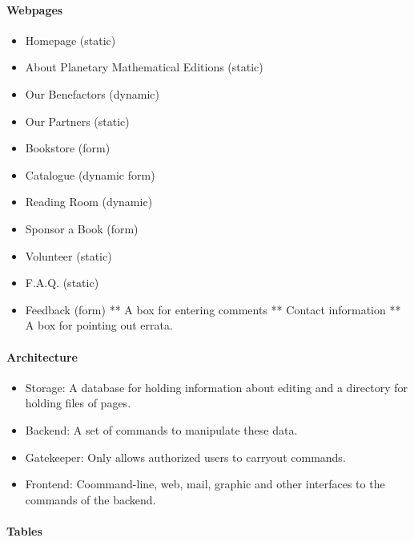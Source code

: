 \begin{itemize}
\paragraph{Webpages}

\begin{itemize}
\item
  Homepage (static)
\item
  About Planetary Mathematical Editions (static)
\item
  Our Benefactors (dynamic)
\item
  Our Partners (static)
\item
  Bookstore (form)
\item
  Catalogue (dynamic form)
\item
  Reading Room (dynamic)
\item
  Sponsor a Book (form)
\item
  Volunteer (static)
\item
  F.A.Q. (static)
\item
  Feedback (form) ** A box for entering comments ** Contact information
  ** A box for pointing out errata.
\end{itemize}

\paragraph{Architecture}

\begin{itemize}
\item
  Storage: A database for holding information about editing and a
  directory for holding files of pages.
\item
  Backend: A set of commands to manipulate these data.
\item
  Gatekeeper: Only allows authorized users to carryout commands.
\item
  Frontend: Coommand-line, web, mail, graphic and other interfaces to
  the commands of the backend.
\end{itemize}

\paragraph{Tables}


\end{itemize}

